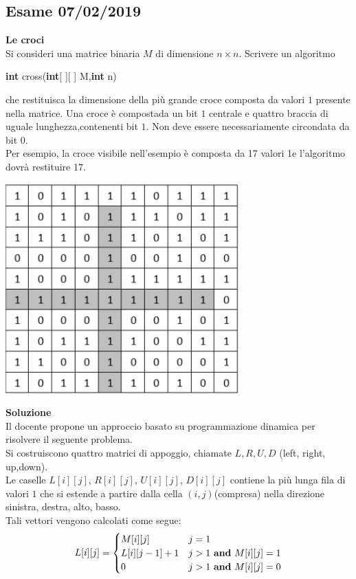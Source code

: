 \documentclass[../cheatSheetAlgoritmi.tex]{subfiles}
\begin{document}
\subsection{Esame 07/02/2019}
\textbf{Le croci} \\
Si consideri una matrice binaria $M$ di dimensione $n \times n$. Scrivere un algoritmo
\begin{center}
\textbf{int} cross(\textbf{int}[ ][ ] M,\textbf{int} n)
\end{center}
che restituisca la dimensione della più grande croce composta da valori $1$ presente nella matrice. Una croce è compostada un bit $1$ centrale e quattro braccia di uguale lunghezza,contenenti bit $1$. Non deve essere necessariamente circondata da bit $0$. \\
Per esempio, la croce visibile nell’esempio è composta da 17 valori 1e l’algoritmo dovrà restituire 17.
\begin{center}
\includegraphics{ ../img/esame_07022019}
\end{center}
\textbf{Soluzione} \\
Il docente propone un approccio basato su programmazione dinamica per risolvere il seguente problema. \\ Si costruiscono quattro matrici di appoggio, chiamate $L,R,U,D$ (left, right, up,down). \\
Le caselle $L[i][j]$, $R[i][j]$, $U[i][j]$, $D[i][j]$ contiene la più lunga fila di valori $1$ che si estende a partire dalla cella $(i, j)$(compresa) nella direzione sinistra, destra, alto, basso. \\
Tali vettori vengono calcolati come segue: 
\begin{equation*}
  	L[i][j] =\begin{cases}
    	M[i][j] & \text{$j = 1$}\\
    	L[i][j-1] + 1 & \text{$j > 1$ \textbf{and} $M[i][j] = 1$}\\
    	0 & \text{$j > 1$ \textbf{and} $M[i][j] = 0$}
  	\end{cases}
\end{equation*}
\end{document}
